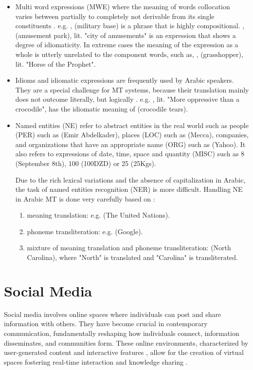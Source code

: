 \begin{itemize}
	\item Multi word expressions (MWE) where the meaning of words collocation varies between partially to completely not derivable from its single constituents \cite{Kordoni14}. e.g. , (military base) is a phrase that is highly compositional. , (amusement park), lit. "city of amusements" is an expression that shows a degree of idiomaticity. In extreme cases the meaning of the expression as a whole is utterly unrelated to the component words, such as, , (grasshopper), lit. "Horse of the Prophet".
	
	\item Idioms and idiomatic expressions are frequently used by Arabic speakers. They are a special challenge for MT systems, because their translation mainly does not outcome literally, but logically \cite{Zaninello20}. e.g.  , lit. "More oppressive than a crocodile", has the idiomatic meaning of (crocodile tears).
	
	\item Named entities (NE) refer to abstract entities in the real world such as people (PER) such as  (Emir Abdelkader), places (LOC) such as  (Mecca), companies, and organizations that have an appropriate name (ORG) such as  (Yahoo). It also refers to expressions of date, time, space and quantity (MISC) such as  8 (September 8th), 100 (100DZD) or 25 (25Kgs).
	
	Due to the rich lexical variations and the absence of capitalization in Arabic, the task of named entities recognition (NER) is more difficult. Handling NE in Arabic MT is done very carefully based on :
	\begin{enumerate}
		\item meaning translation: e.g.  (The United Nations).
		\item phoneme transliteration: e.g.  (Google).
		\item mixture of meaning translation and phoneme transliteration:  (North Carolina), where "North" is translated and "Carolina" is transliterated.
	\end{enumerate}   
\end{itemize}

\section{Social Media}
Social media involves online spaces where individuals can post and share information with others. They have become crucial in contemporary communication, fundamentally reshaping how individuals connect, information disseminates, and communities form. These online environments, characterized by user-generated content and interactive features \cite{boyd08},  allow for the creation of virtual spaces fostering real-time interaction and knowledge sharing \cite{yaqub23}.

